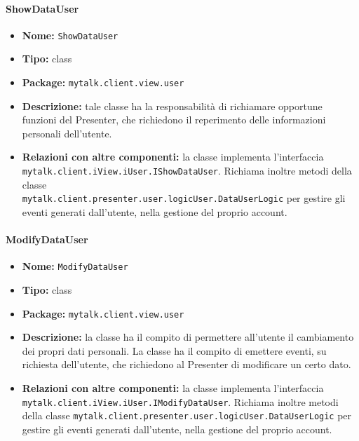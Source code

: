 {{\paragraph{ShowDataUser}{
	\begin{itemize}
		\item [] \textbf{Nome:} \texttt{ShowDataUser}
		\item [] \textbf{Tipo:} class
		\item [] \textbf{Package:} \texttt{mytalk.client.view.user}
		\item [] \textbf{Descrizione:} tale classe ha la responsabilità di richiamare opportune funzioni del Presenter, che richiedono il reperimento delle informazioni personali dell'utente.
		\item [] \textbf{Relazioni con altre componenti:} la classe implementa l'interfaccia\\ \texttt{mytalk.client.iView.iUser.IShowDataUser}. Richiama inoltre metodi della classe\\ \texttt{mytalk.client.presenter.user.logicUser.DataUserLogic} per gestire gli eventi generati dall'utente, nella gestione del proprio account.
	\end{itemize}
}
\paragraph{ModifyDataUser}{
	\begin{itemize}
		\item [] \textbf{Nome:} \texttt{ModifyDataUser}
		\item [] \textbf{Tipo:} class
		\item [] \textbf{Package:} \texttt{mytalk.client.view.user}
		\item [] \textbf{Descrizione:} la classe ha il compito di permettere all'utente il cambiamento dei propri dati personali. La classe ha il compito di emettere eventi, su richiesta dell'utente, che richiedono al Presenter di modificare un certo dato.
		\item [] \textbf{Relazioni con altre componenti:} la classe implementa l'interfaccia\\ \texttt{mytalk.client.iView.iUser.IModifyDataUser}.
		Richiama inoltre metodi della classe \texttt{mytalk.client.presenter.user.logicUser.DataUserLogic} per gestire gli eventi generati dall'utente, nella gestione del proprio account.
	\end{itemize}
}
}}
